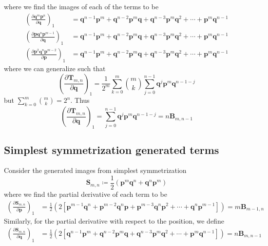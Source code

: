 \documentclass[a4paper]{article}
\theoremstyle{definition}
\begin{document}
	where we find the images of each of the terms to be
	\begin{align}
		\left(\frac{\partial\textbf{q}^m\textbf{p}^n}{\partial\textbf{q}}\right)_1&=\textbf{q}^{n-1}\textbf{p}^m+\textbf{q}^{n-2}\textbf{p}^m\textbf{q}+\textbf{q}^{n-3}\textbf{p}^m\textbf{q}^{2}+\cdots+\textbf{p}^m\textbf{q}^{n-1} \\
		\left(\frac{\partial\textbf{p}\textbf{q}^n\textbf{p}^{m-1}}{\partial\textbf{q}}\right)_1&=\textbf{q}^{n-1}\textbf{p}^m+\textbf{q}^{n-2}\textbf{p}^m\textbf{q}+\textbf{q}^{n-3}\textbf{p}^m\textbf{q}^{2}+\cdots+\textbf{p}^m\textbf{q}^{n-1} \\
		\left(\frac{\partial\textbf{p}^2\textbf{q}^n\textbf{p}^{m-2}}{\partial\textbf{p}}\right)_1&=\textbf{q}^{n-1}\textbf{p}^m+\textbf{q}^{n-2}\textbf{p}^m\textbf{q}+\textbf{q}^{n-3}\textbf{p}^m\textbf{q}^{2}+\cdots+\textbf{p}^m\textbf{q}^{n-1}
	\end{align}
	where we can generalize such that
	\begin{equation}
		\left(\frac{\partial\textbf{T}_{m,n}}{\partial\textbf{q}}\right)_1=\frac{1}{2^m}\sum_{k=0}^m\binom{m}{k}\sum_{j=0}^{n-1}\textbf{q}^j\textbf{p}^m\textbf{q}^{n-1-j}
	\end{equation}
	but $\displaystyle\sum_{k=0}^m\binom{m}{k}=2^n$. Thus
	\begin{equation}
		\left(\frac{\partial\textbf{T}_{m,n}}{\partial\textbf{q}}\right)_1=\sum_{j=0}^{n-1}\textbf{q}^j\textbf{p}^m\textbf{q}^{n-1-j}=n\textbf{B}_{m,n-1}
	\end{equation}
	\subsection{Simplest symmetrization generated terms}
	Consider the generated images from simplest symmetrization
	\begin{equation}
		\textbf{S}_{m,n}\coloneqq\frac{1}{2}(\textbf{p}^m\textbf{q}^n+\textbf{q}^n\textbf{p}^m)
	\end{equation}
	where we find the partial derivative of each term to be
	\begin{align}
		\left( \frac{\partial\textbf{S}_{m,n}}{\partial\textbf{p}}\right)_1&=\frac{1}{2}\left(2[\textbf{p}^{m-1}\textbf{q}^n+\textbf{p}^{m-2}\textbf{q}^n\textbf{p}+\textbf{p}^{m-3}\textbf{q}^n\textbf{p}^2+\cdots+\textbf{q}^n\textbf{p}^{m-1}]\right)=m\textbf{B}_{m-1,n}
	\end{align}
	Similarly, for the partial derivative with respect to the position, we define
	\begin{align}
		\left( \frac{\partial\textbf{S}_{m,n}}{\partial\textbf{q}}\right)_1&=\frac{1}{2}\left(2[\textbf{q}^{n-1}\textbf{p}^m+\textbf{q}^{n-2}\textbf{p}^m\textbf{q}+\textbf{q}^{n-3}\textbf{p}^m\textbf{q}^2+\cdots+\textbf{p}^m\textbf{q}^{n-1}]\right)=n\textbf{B}_{m,n-1}
	\end{align}
	
\end{document}
